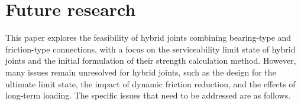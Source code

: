 \begin{itemize}



\end{itemize}





\section{Future research}


This paper explores the feasibility of hybrid joints combining bearing-type and friction-type connections, with a focus on the serviceability limit state of hybrid joints and the initial formulation of their strength calculation method. However, many issues remain unresolved for hybrid joints, such as the design for the ultimate limit state, the impact of dynamic friction reduction, and the effects of long-term loading. The specific issues that need to be addressed are as follows.


